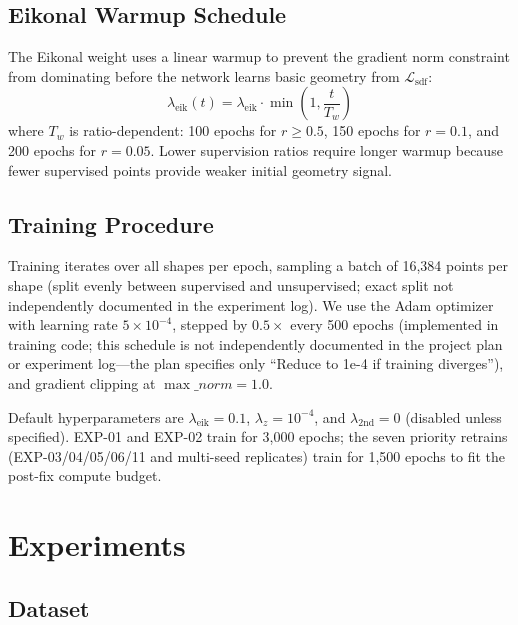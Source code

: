 \documentclass[conference]{IEEEtran}
\begin{document}
\subsection{Eikonal Warmup Schedule}

The Eikonal weight uses a linear warmup to prevent the gradient norm constraint from dominating before the network learns basic geometry from $\mathcal{L}_{\text{sdf}}$:
\begin{equation}
    \lambda_{\text{eik}}(t) = \lambda_{\text{eik}} \cdot \min\left(1, \frac{t}{T_w}\right)
\end{equation}
where $T_w$ is ratio-dependent: 100 epochs for $r \geq 0.5$, 150 epochs for $r = 0.1$, and 200 epochs for $r = 0.05$. Lower supervision ratios require longer warmup because fewer supervised points provide weaker initial geometry signal.

\subsection{Training Procedure}

Training iterates over all shapes per epoch, sampling a batch of 16{,}384 points per shape (split evenly between supervised and unsupervised; exact split not independently documented in the experiment log). We use the Adam optimizer with learning rate $5 \times 10^{-4}$, stepped by $0.5\times$ every 500 epochs (implemented in training code; this schedule is not independently documented in the project plan or experiment log---the plan specifies only ``Reduce to 1e-4 if training diverges''), and gradient clipping at $\max\_norm = 1.0$.

Default hyperparameters are $\lambda_{\text{eik}} = 0.1$, $\lambda_z = 10^{-4}$, and $\lambda_{\text{2nd}} = 0$ (disabled unless specified). EXP-01 and EXP-02 train for 3{,}000 epochs; the seven priority retrains (EXP-03/04/05/06/11 and multi-seed replicates) train for 1{,}500 epochs to fit the post-fix compute budget.

\section{Experiments}

\subsection{Dataset}
\label{sec:dataset}
\end{document}
